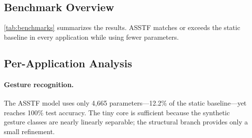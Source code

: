 \documentclass[11pt,a4paper]{article}
\theoremstyle{definition}
\begin{document}
\subsection{Benchmark Overview}
\label{subsec:benchmark_overview}

\begin{table}[t]
\centering
\small
\setlength{\tabcolsep}{4pt}
\caption{ASSTF vs.	static baseline across six applications. Data: App 01--05 use reproducible synthetic benchmarks; App 06 uses real SST-2 with a custom SentencePiece tokenizer.}
\label{tab:benchmarks}
\end{table}

\cref{tab:benchmarks} summarizes the results. ASSTF matches or exceeds the static baseline in every application while using fewer parameters.

\subsection{Per-Application Analysis}
\label{subsec:per_app}

\paragraph{Gesture recognition.} The ASSTF model uses only 4,665 parameters---12.2\% of the static baseline---yet reaches 100\% test accuracy. The tiny core is sufficient because the synthetic gesture classes are nearly linearly separable; the structural branch provides only a small refinement.
\end{document}
